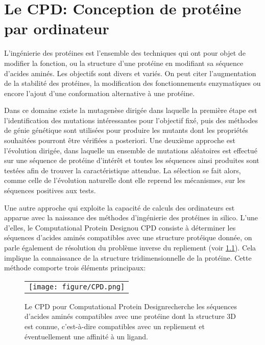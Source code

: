 \chapter{Le \og CPD\fg: Conception de protéine par ordinateur}
\label{chap:CPD}
L'ingénierie des protéines est l'ensemble des techniques qui ont pour objet de modifier la fonction, ou la structure d'une protéine en modifiant sa séquence d'acides aminés. Les objectifs sont divers et variés. On peut citer l'augmentation de la stabilité des protéines, la  modification des fonctionnements enzymatiques ou encore l'ajout d'une conformation alternative à une protéine.

Dans ce domaine existe la mutagenèse dirigée dans laquelle la première étape est l'identification des mutations intéressantes pour l'objectif fixé, puis des méthodes de génie génétique sont utilisées pour produire les mutants dont les propriétés souhaitées pourront être vérifiées a posteriori. Une deuxième approche est l'évolution dirigée, dans laquelle un ensemble de mutations aléatoires est effectué sur une séquence de protéine d'intérêt et toutes les séquences ainsi produites sont testées afin de trouver la caractéristique attendue. La sélection se fait alors, comme celle de l'évolution naturelle dont elle reprend les mécanismes, sur les séquences positives aux tests.

Une autre approche qui exploite la capacité de calculs des ordinateurs est apparue avec la naissance des méthodes d'ingénierie des protéines \og in silico\fg. L'une d'elles, le \og Computational Protein Design\fg ou CPD consiste à déterminer les séquences d'acides aminés compatibles avec une structure protéique donnée, on parle également de résolution du problème inverse du repliement (voir \ref{graph:CPD}). Cela implique la connaissance de la structure tridimensionnelle de la protéine. Cette méthode comporte trois éléments principaux:

   \begin{figure}[!htbp]
     \centering
     \begin{tabular}{c}
       \texttt{[image: figure/CPD.png]} &
     \end{tabular}
     
     \caption{Le CPD pour \og Computational Protein Design\fg recherche les séquences d'acides aminés compatibles avec une protéine dont la structure 3D  est connue, c'est-à-dire compatibles avec un repliement et éventuellement une affinité à un ligand.}
\label{graph:CPD}
   \end{figure}


